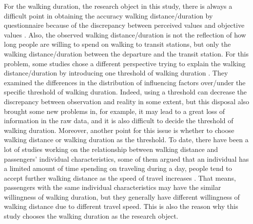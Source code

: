 %
For the walking duration, the research object in this study, there is always a difficult point in obtaining the accuracy walking distance/duration by questionnaire because of the discrepancy between perceived values and objective values \cite{BadlandHannahMandSchofieldGrantMandSchluter2007,McCormack2008}. Also, the observed walking distance/duration is not the reflection of how long people are willing to spend on walking to transit stations, but only the walking distance/duration between the departure and the transit station. For this problem, some studies chose a different perspective trying to explain the walking distance/duration by introducing one threshold of walking duration \cite{Besser2005,McCormack2008}. They examined the differences in the distribution of influencing factors over/under the specific threshold of walking duration. Indeed, using a threshold can decrease the discrepancy between observation and reality in some extent, but this disposal also brought some new problems in, for example, it may lead to a great loss of information in the raw data, and it is also difficult to decide the threshold of walking duration. Moreover, another point for this issue is whether to choose walking distance or walking duration as the threshold. To date, there have been a lot of studies working on the relationship between walking distance and passengers' individual characteristics, some of them argued that an individual has a limited amount of time spending on traveling during a day, people tend to accept further walking distance as the speed of travel increases \cite{Marchetti1994,Larsen2010}. That means, passengers with the same individual characteristics may have the similar willingness of walking duration, but they generally have different willingness of walking distance due to different travel speed. This is also the reason why this study chooses the walking duration as the research object.

